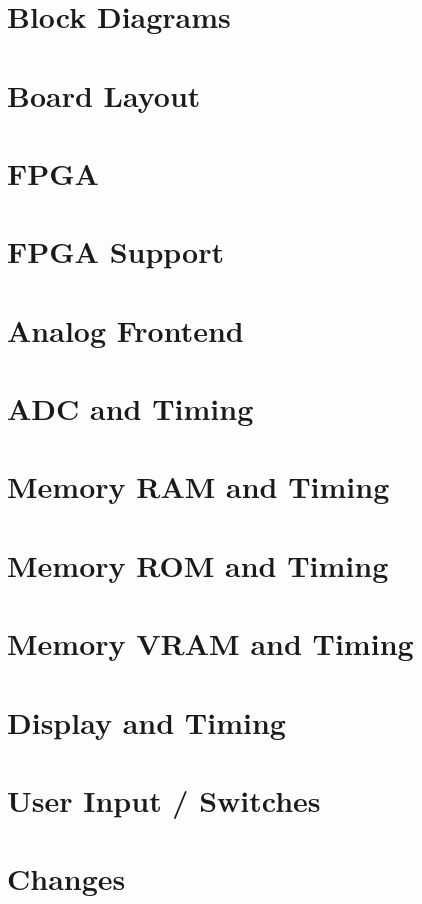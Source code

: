 \section{Block Diagrams} %

\section{Board Layout} %

\section{FPGA}

\section{FPGA Support}

\section{Analog Frontend}

\section{ADC and Timing}

\section{Memory RAM and Timing}

\section{Memory ROM and Timing}

\section{Memory VRAM and Timing}

\section{Display and Timing}

\section{User Input / Switches}

\section{Changes}

